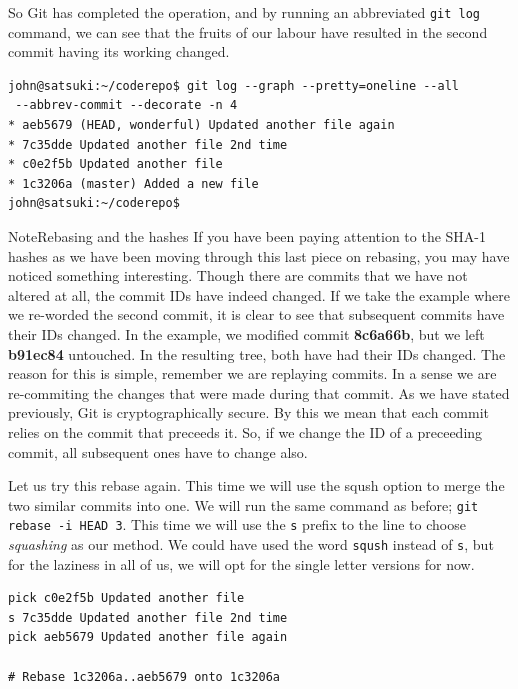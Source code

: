 So Git has completed the operation, and by running an abbreviated \texttt{git log} command, we can see that the fruits of our labour have resulted in the second commit having its working changed.

\begin{Verbatim}
john@satsuki:~/coderepo$ git log --graph --pretty=oneline --all 
 --abbrev-commit --decorate -n 4
* aeb5679 (HEAD, wonderful) Updated another file again
* 7c35dde Updated another file 2nd time
* c0e2f5b Updated another file
* 1c3206a (master) Added a new file
john@satsuki:~/coderepo$ 
\end{Verbatim}

\begin{callout}{Note}{Rebasing and the hashes}
If you have been paying attention to the SHA-1 hashes as we have been moving through this last piece on rebasing, you may have noticed something interesting.  Though there are commits that we have not altered at all, the commit IDs have indeed changed.  If we take the example where we re-worded the second commit, it is clear to see that subsequent commits have their IDs changed.  In the example, we modified commit \textbf{8c6a66b}, but we left \textbf{b91ec84} untouched.  In the resulting tree, both have had their IDs changed.
\newline
\newline
The reason for this is simple, remember we are replaying commits.  In a sense we are re-commiting the changes that were made during that commit.  As we have stated previously, Git is cryptographically secure.  By this we mean that each commit relies on the commit that preceeds it.  So, if we change the ID of a preceeding commit, all subsequent ones have to change also.
\end{callout}

Let us try this rebase again.  This time we will use the sqush option to merge the two similar commits into one.  We will run the same command as before; \texttt{git rebase -i HEAD~3}.  This time we will use the \texttt{s} prefix to the line to choose \emph{squashing} as our method.  We could have used the word \texttt{sqush} instead of \texttt{s}, but for the laziness in all of us, we will opt for the single letter versions for now.

\begin{Verbatim}
pick c0e2f5b Updated another file
s 7c35dde Updated another file 2nd time
pick aeb5679 Updated another file again

# Rebase 1c3206a..aeb5679 onto 1c3206a
\end{Verbatim}

